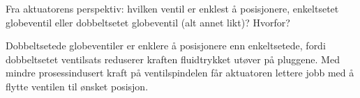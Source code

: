

Fra aktuatorens perspektiv: hvilken ventil er enklest å posisjonere, enkeltsetet globeventil eller dobbeltsetet globeventil (alt annet likt)? Hvorfor?







Dobbeltsetede globeventiler er enklere å posisjonere enn enkeltsetede, fordi dobbeltsetet ventilsats reduserer kraften fluidtrykket utøver på pluggene. Med mindre prosessindusert kraft på ventilspindelen får aktuatoren lettere jobb med å flytte ventilen til ønsket posisjon.











